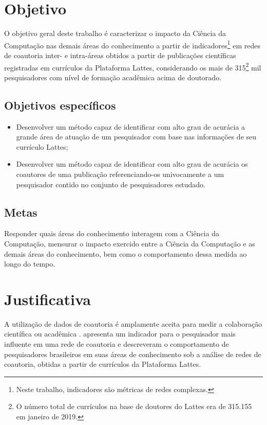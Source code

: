 \section{Objetivo}

O objetivo geral deste trabalho é caracterizar o impacto da Ciência da Computação nas demais áreas do conhecimento a partir de indicadores\footnote{Neste trabalho, indicadores são métricas de redes complexas.} em redes de coautoria inter- e intra-áreas obtidos a partir de publicações científicas registradas em currículos da Plataforma Lattes, considerando os mais de 315\footnote{O número total de currículos na base de doutores do Lattes era de 315.155 em janeiro de 2019.} mil pesquisadores com nível de formação acadêmica acima de doutorado.

\subsection{Objetivos específicos}

\begin{itemize}
\item Desenvolver um método capaz de identificar com alto grau de acurácia a grande área de atuação de um pesquisador com base nas informações de seu currículo Lattes;

\item Desenvolver um método capaz de identificar com alto grau de acurácia os coautores de uma publicação referenciando-os univocamente a um pesquisador contido no conjunto de pesquisadores estudado.
\end{itemize}

\subsection{Metas}

Responder quais áreas do conhecimento interagem com a Ciência da Computação, mensurar o impacto exercido entre a Ciência da Computação e as demais áreas do conhecimento, bem como o comportamento dessa medida ao longo do tempo.

\section{Justificativa}

A utilização de dados de coautoria é amplamente aceita para medir a colaboração científica ou acadêmica \cite{katz1997research}.  apresenta um indicador para o pesquisador mais influente em uma rede de coautoria e  descreveram o comportamento de pesquisadores brasileiros em suas áreas de conhecimento sob a análise de redes de coautoria, obtidas a partir de currículos da Plataforma Lattes.

